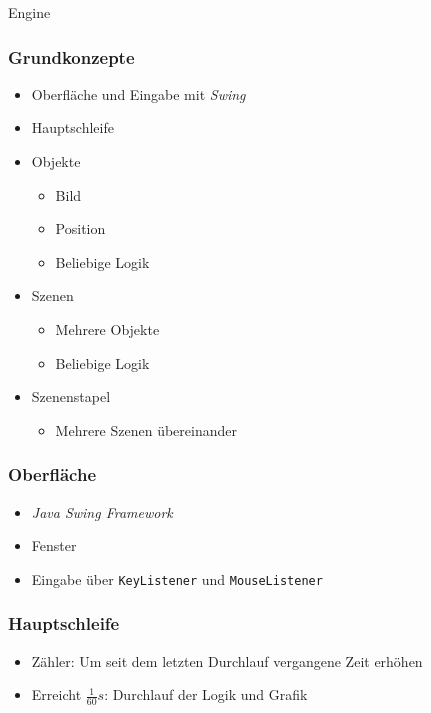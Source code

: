 \begin{frame}
	\begin{center}
		\Huge Engine
	\end{center}
\end{frame}


\begin{frame}
	\frametitle{Grundkonzepte}
	\begin{itemize}
		\item Oberfläche und Eingabe mit \textit{Swing} \pause
		\item Hauptschleife \pause
		\item Objekte \pause
		\begin{itemize}
			\item Bild
			\item Position
			\item Beliebige Logik
		\end{itemize} \pause
		\item Szenen \pause
		\begin{itemize}
			\item Mehrere Objekte
			\item Beliebige Logik
		\end{itemize} \pause
		\item Szenenstapel \pause
		\begin{itemize}
			\item Mehrere Szenen übereinander
		\end{itemize}
	\end{itemize}
\end{frame}

\begin{frame}
	\frametitle{Oberfläche}
	\begin{itemize}
		\item \textit{Java Swing Framework} \pause
		\item Fenster \pause
		\item Eingabe über \texttt{KeyListener} und \texttt{MouseListener}
	\end{itemize}
\end{frame}

\begin{frame}
	\frametitle{Hauptschleife}
	\begin{itemize}
		\item Zähler: Um seit dem letzten Durchlauf vergangene Zeit erhöhen \pause
		\item Erreicht $\frac{1}{60}s$: Durchlauf der Logik und Grafik
	\end{itemize}
\end{frame}

